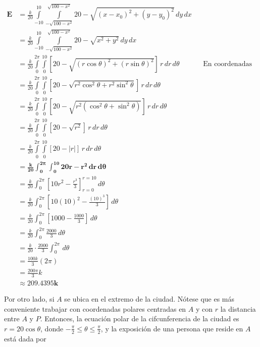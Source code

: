 \documentclass[12pt]{exam}
\begin{document}
\begin{questions}
\begin{enumerate}[a)]
  \begin{align*}
    \mathbf{E}
    &=\frac{k}{20}\int\limits_{-10}^{10}\int\limits_{-\sqrt{100-x^2}}^{\sqrt{100-x^2}} 20-\sqrt{(x-x_0)^2+(y-y_0)^2}\,dy\,dx\\
    &=\frac{k}{20}\int\limits_{-10}^{10}\int\limits_{-\sqrt{100-x^2}}^{\sqrt{100-x^2}} 20-\sqrt{x^2+y^2}\,dy\,dx \\
    &=\frac{k}{20}\int\limits_{0}^{2\pi}\int\limits_{0}^{10} [20-\sqrt{(r\cos{\theta})^2+(r\sin{\theta})^2}]\,r\,dr\,d\theta && \text{En coordenadas polares} \\
    &=\frac{k}{20}\int\limits_{0}^{2\pi}\int\limits_{0}^{10} [20-\sqrt{r^2\cos^2{\theta}+r^2\sin^2{\theta}}]\,r\,dr\,d\theta \\
    &=\frac{k}{20}\int\limits_{0}^{2\pi}\int\limits_{0}^{10} [20-\sqrt{r^2(\cos^2{\theta}+\sin^2{\theta})}]\,r\,dr\,d\theta \\
    &= \frac{k}{20}\int\limits_{0}^{2\pi}\int\limits_{0}^{10} [20-\sqrt{r^2}]\,r\,dr\,d\theta \\
    &= \frac{k}{20}\int\limits_{0}^{2\pi}\int\limits_{0}^{10} [20-|r|]\,r\,dr\,d\theta \\
    &=\mathbf{\frac{k}{20}\int_0^{2\pi}\int_0^{10} 20r-r^2\,dr\,d\theta} \\
    &=\frac{k}{20}\int_0^{2\pi}\left[10r^2-\frac{r^3}{3}\right]_{r=0}^{r=10}\,d\theta \\
    &=\frac{k}{20}\int_0^{2\pi}\left[10(10)^2-\frac{(10)^3}{3}\right]\,d\theta \\
    &=\frac{k}{20}\int_0^{2\pi}\left[1000-\frac{1000}{3}\right]\,d\theta \\
    &=\frac{k}{20}\int_0^{2\pi}\frac{2000}{3}\,d\theta \\
    &=\frac{k}{20}\cdot \frac{2000}{3}\int_0^{2\pi}\,d\theta \\
    &=\frac{100k}{3}(2\pi) \\
    &= \frac{200\pi}{3}k \\
    & \mathbf{\approx 209.4395 k}
  \end{align*}

  Por otro lado, si $A$ se ubica en el extremo de la ciudad. 
  Nótese que es más conveniente trabajar con coordenadas polares centradas en $A$ y con $r$ la distancia entre $A$ y $P$. 
  Entonces, la ecuación polar de la cifcunferencia de la ciudad es $r=20\cos{\theta}$, donde $-\frac{\pi}{2}\leq \theta \leq \frac{\pi}{2}$, 
  y la exposición de una persona que reside en $A$ está dada por


\end{enumerate}
\end{questions}
\end{document}
